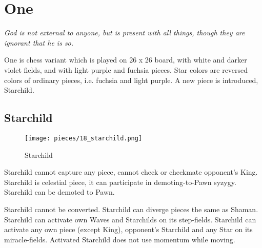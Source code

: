 

\chapter*{One}
\label{ch:One}

\begin{flushright}
\parbox{0.8\textwidth}{
\emph{God is not external to anyone, but is present with all things, though
they are ignorant that he is so. \newline
{} } }
\end{flushright}

\noindent
One is chess variant which is played on 26 x 26 board, with white and
darker violet fields, and with light purple and fuchsia pieces. Star
colors are reversed colors of ordinary pieces, i.e. fuchsia and light
purple. A new piece is introduced, Starchild.

\clearpage %

\section*{Starchild}
\label{sec:One/Starchild}

\vspace*{-0.8\baselineskip}
\noindent
\begin{wrapfigure}[11]{l}{0.4\textwidth}
\centering
\texttt{[image: pieces/18\_starchild.png]}
\caption{Starchild}
\label{fig:18_starchild}
\end{wrapfigure}
Starchild cannot capture any piece, cannot check or checkmate opponent's King.
Starchild is celestial piece, it can participate in demoting-to-Pawn syzygy.
Starchild can be demoted to Pawn.

Starchild cannot be converted. Starchild can diverge pieces the same as Shaman.
Starchild can activate own Waves and Starchilds on its step-fields. Starchild can
activate any own piece (except King), opponent's Starchild and any Star on its
miracle-fields. Activated Starchild does not use momentum while moving.


